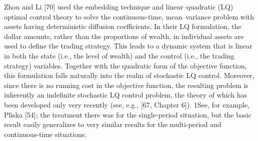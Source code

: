 Zhou and Li [70] used the embedding technique and linear–quadratic (LQ) optimal control theory to solve the continuous-time, mean–variance problem with assets having deterministic diffusion coefficients. In their LQ formulation, the dollar amounts, rather than the proportions of wealth, in individual assets are used to define the trading strategy. This leads to a dynamic system that is linear in both the state (i.e., the level of wealth) and the control (i.e., the trading strategy) variables. Together with the quadratic form of the objective function, this formulation falls naturally into the realm of stochastic LQ control. Moreover, since there is no running cost in the objective function, the resulting problem is inherently an indefinite stochastic LQ control problem, the theory of which has been developed only very recently (see, e.g., [67, Chapter 6]).
1See, for example, Pliska [54]; the treatment there was for the single-period situation, but the basic result easily generalizes to very similar results for the multi-period and continuous-time situations.


